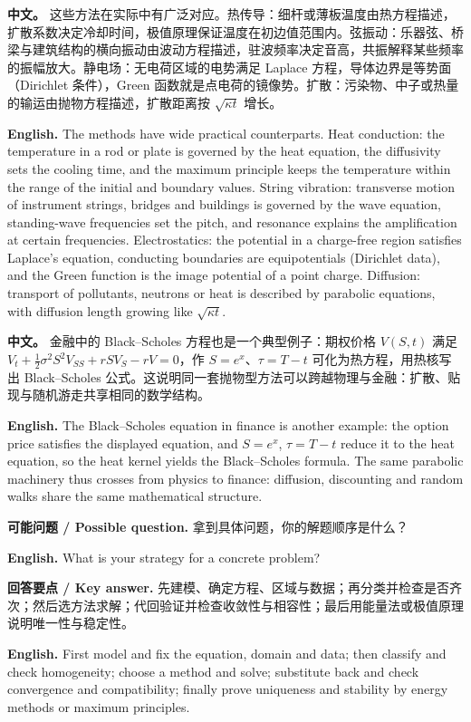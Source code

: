 \documentclass[UTF8,11pt,a4paper]{ctexart}
\newcommand{\EN}[1]{\par\noindent \textbf{English.} #1\par}
\newcommand{\ASK}[4]{\par\noindent \textbf{可能问题 / Possible question.} #1\par\EN{#2}\noindent \textbf{回答要点 / Key answer.} #3\par\EN{#4}\medskip}
\newcommand{\APS}[2]{\par\noindent\textbf{中文。} #1\par\noindent\textbf{English.} #2\par\smallskip}
\begin{document}
\normalsize
\APS{这些方法在实际中有广泛对应。热传导：细杆或薄板温度由热方程描述，扩散系数决定冷却时间，极值原理保证温度在初边值范围内。弦振动：乐器弦、桥梁与建筑结构的横向振动由波动方程描述，驻波频率决定音高，共振解释某些频率的振幅放大。静电场：无电荷区域的电势满足 Laplace 方程，导体边界是等势面（Dirichlet 条件），Green 函数就是点电荷的镜像势。扩散：污染物、中子或热量的输运由抛物方程描述，扩散距离按 $\sqrt{\kappa t}$ 增长。}{The methods have wide practical counterparts. Heat conduction: the temperature in a rod or plate is governed by the heat equation, the diffusivity sets the cooling time, and the maximum principle keeps the temperature within the range of the initial and boundary values. String vibration: transverse motion of instrument strings, bridges and buildings is governed by the wave equation, standing-wave frequencies set the pitch, and resonance explains the amplification at certain frequencies. Electrostatics: the potential in a charge-free region satisfies Laplace's equation, conducting boundaries are equipotentials (Dirichlet data), and the Green function is the image potential of a point charge. Diffusion: transport of pollutants, neutrons or heat is described by parabolic equations, with diffusion length growing like $\sqrt{\kappa t}$.}
\APS{金融中的 Black--Scholes 方程也是一个典型例子：期权价格 $V(S,t)$ 满足 $V_t+\frac12\sigma^2S^2V_{SS}+rSV_S-rV=0$，作 $S=e^x$、$\tau=T-t$ 可化为热方程，用热核写出 Black--Scholes 公式。这说明同一套抛物型方法可以跨越物理与金融：扩散、贴现与随机游走共享相同的数学结构。}{The Black--Scholes equation in finance is another example: the option price satisfies the displayed equation, and $S=e^x$, $\tau=T-t$ reduce it to the heat equation, so the heat kernel yields the Black--Scholes formula. The same parabolic machinery thus crosses from physics to finance: diffusion, discounting and random walks share the same mathematical structure.}
\ASK{拿到具体问题，你的解题顺序是什么？}{What is your strategy for a concrete problem?}{先建模、确定方程、区域与数据；再分类并检查是否齐次；然后选方法求解；代回验证并检查收敛性与相容性；最后用能量法或极值原理说明唯一性与稳定性。}{First model and fix the equation, domain and data; then classify and check homogeneity; choose a method and solve; substitute back and check convergence and compatibility; finally prove uniqueness and stability by energy methods or maximum principles.}
\end{document}
